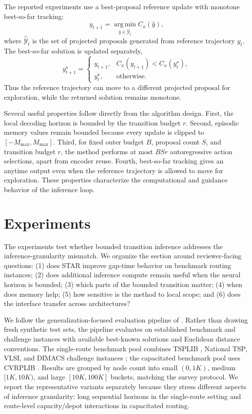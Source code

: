 \documentclass[11pt]{article}
\newcommand{\method}{\textsc{STAR}}
\newcommand{\cY}{\mathcal{Y}}
\newcommand{\cost}{C}
\newcommand{\argmin}{\operatorname*{arg\,min}}
\begin{document}
The reported experiments use a best-proposal reference update with monotone best-so-far tracking:
\begin{equation}
  y_{t+1}=
  \argmin_{\hat y\in\widehat{\cY}_t}\cost_x(\hat y),
  \label{eq:accept}
\end{equation}
where $\widehat{\cY}_t$ is the set of projected proposals generated from reference trajectory $y_t$. The best-so-far solution is updated separately,
\begin{equation}
  y_{t+1}^\star=
  \begin{cases}
  y_{t+1}, & \cost_x(y_{t+1})<\cost_x(y_t^\star),\\
  y_t^\star, & \text{otherwise.}
  \end{cases}
  \label{eq:best}
\end{equation}
Thus the reference trajectory can move to a different projected proposal for exploration, while the returned solution remains monotone.

Several useful properties follow directly from the algorithm design. First, the local decoding horizon is bounded by the transition budget $r$. Second, episodic memory values remain bounded because every update is clipped to $[-M_{\max},M_{\max}]$. Third, for fixed outer budget $B$, proposal count $S$, and transition budget $r$, the method performs at most $BSr$ autoregressive action selections, apart from encoder reuse. Fourth, best-so-far tracking gives an anytime output even when the reference trajectory is allowed to move for exploration. These properties characterize the computational and guidance behavior of the inference loop.

\section{Experiments}
\label{sec:experiments}

The experiments test whether bounded transition inference addresses the inference-granularity mismatch. We organize the section around reviewer-facing questions: (1) does \method{} improve gap-time behavior on benchmark routing instances; (2) does additional inference compute remain useful when the neural horizon is bounded; (3) which parts of the bounded transition matter; (4) when does memory help; (5) how sensitive is the method to local scope; and (6) does the interface transfer across architectures?

We follow the generalization-focused evaluation pipeline of \citet{nrs_survey}. Rather than drawing fresh synthetic test sets, the pipeline evaluates on established benchmark and challenge instances with available best-known solutions and Euclidean distance conventions. The single-route benchmark pool combines TSPLIB \citep{tsplib}, National TSP, VLSI, and DIMACS challenge instances \citep{national_tsp,vlsi_tsp,dimacs_tsp}; the capacitated benchmark pool uses CVRPLIB \citep{cvrplib}. Results are grouped by node count into small $(0,1K)$, medium $[1K,10K)$, and large $[10K,100K]$ buckets, matching the survey protocol. We report the representative variants separately because they stress different aspects of inference granularity: long sequential horizons in the single-route setting and route-level capacity/depot interactions in capacitated routing.
\end{document}
